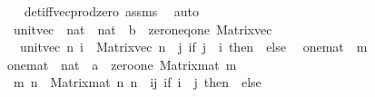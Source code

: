 \begin{isabellebody}
%
\isadelimproof
\ \ %
\endisadelimproof
%
\isatagproof
{}\isamarkupfalse%
\ det{\isacharunderscore}{\kern0pt}{}{\isacharunderscore}{\kern0pt}iff{\isacharunderscore}{\kern0pt}vec{\isacharunderscore}{\kern0pt}prod{\isacharunderscore}{\kern0pt}zero\ assms\ \isamarkupfalse%
\ auto%
\endisatagproof
{\isafoldproof}%
%
\isadelimproof
\isanewline
%
\endisadelimproof
\isanewline
{}\isamarkupfalse%
\isanewline
\ \ unit{\isacharunderscore}{\kern0pt}vec{}\ {\isacharcolon}{\kern0pt}{\isacharcolon}{\kern0pt}\ {\isachardoublequoteopen}nat\ {\isasymRightarrow}\ nat\ {\isasymRightarrow}\ {\isacharparenleft}{\kern0pt}{\isacharprime}{\kern0pt}b\ {\isacharcolon}{\kern0pt}{\isacharcolon}{\kern0pt}\ zero{\isacharunderscore}{\kern0pt}neq{\isacharunderscore}{\kern0pt}one{\isacharparenright}{\kern0pt}\ Matrix{\isachardot}{\kern0pt}vec{\isachardoublequoteclose}\isanewline
\ \ \ {\isachardoublequoteopen}unit{\isacharunderscore}{\kern0pt}vec{}\ n\ i\ {\isacharequal}{\kern0pt}\ Matrix{\isachardot}{\kern0pt}vec\ n\ {\isacharparenleft}{\kern0pt}{\isasymlambda}\ j{\isachardot}{\kern0pt}\ if\ j\ {\isacharequal}{\kern0pt}\ i\ then\ {}\ else\ {}{\isacharparenright}{\kern0pt}{\isachardoublequoteclose}\isanewline
\isanewline
{}\isamarkupfalse%
\ one{\isacharunderscore}{\kern0pt}mat\ {\isacharparenleft}{\kern0pt}\ {\isachardoublequoteopen}{}\isactrlsub m{\isachardoublequoteclose}{\isacharparenright}{\kern0pt}\isanewline
\isanewline
{}\isamarkupfalse%
\ one{\isacharunderscore}{\kern0pt}mat{}\ {\isacharcolon}{\kern0pt}{\isacharcolon}{\kern0pt}\ {\isachardoublequoteopen}nat\ {\isasymRightarrow}\ {\isacharprime}{\kern0pt}a\ {\isacharcolon}{\kern0pt}{\isacharcolon}{\kern0pt}\ {\isacharbraceleft}{\kern0pt}zero{\isacharcomma}{\kern0pt}one{\isacharbraceright}{\kern0pt}\ Matrix{\isachardot}{\kern0pt}mat{\isachardoublequoteclose}\ {\isacharparenleft}{\kern0pt}{\isachardoublequoteopen}{}\isactrlsub m{\isachardoublequoteclose}{\isacharparenright}{\kern0pt}\ \isanewline
\ \ {\isachardoublequoteopen}{}\isactrlsub m\ n\ {\isasymequiv}\ Matrix{\isachardot}{\kern0pt}mat\ n\ n\ {\isacharparenleft}{\kern0pt}{\isasymlambda}\ {\isacharparenleft}{\kern0pt}i{\isacharcomma}{\kern0pt}j{\isacharparenright}{\kern0pt}{\isachardot}{\kern0pt}\ if\ i\ {\isacharequal}{\kern0pt}\ j\ then\ {}\ else\ {}{\isacharparenright}{\kern0pt}{\isachardoublequoteclose}\isanewline

\end{isabellebody}
